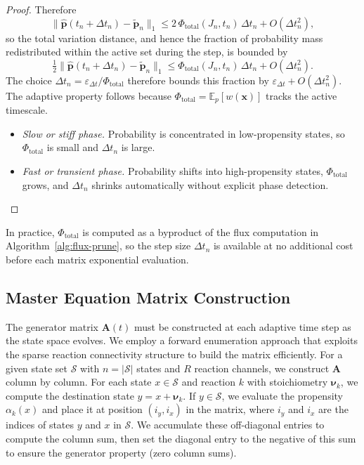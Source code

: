 \documentclass[onefignum,onetabnum]{siamart171218}
\begin{document}
\begin{proof}
Therefore
\[
\|\widehat{\boldsymbol{p}}(t_n+\Delta t_n) - \widetilde{\boldsymbol{p}}_n\|_1
\leq 2\,\Phi_{\mathrm{total}}(J_n,t_n)\,\Delta t_n + O(\Delta t_n^2),
\]
so the total variation distance, and hence the fraction of probability mass redistributed within the active set during the step, is bounded by
\[
\tfrac{1}{2}\|\widehat{\boldsymbol{p}}(t_n+\Delta t_n) - \widetilde{\boldsymbol{p}}_n\|_1
\leq \Phi_{\mathrm{total}}(J_n,t_n)\,\Delta t_n + O(\Delta t_n^2).
\]
The choice $\Delta t_n = \varepsilon_{\Delta t}/\Phi_{\mathrm{total}}$ therefore bounds this fraction by $\varepsilon_{\Delta t} + O(\Delta t_n^2)$. The adaptive property follows because $\Phi_{\mathrm{total}} = \mathbb{E}_p[w(\boldsymbol{x})]$ tracks the active timescale.
\begin{itemize}
\item \emph{Slow or stiff phase.} Probability is concentrated in low-propensity states, so $\Phi_{\mathrm{total}}$ is small and $\Delta t_n$ is large.
\item \emph{Fast or transient phase.} Probability shifts into high-propensity states, $\Phi_{\mathrm{total}}$ grows, and $\Delta t_n$ shrinks automatically without explicit phase detection.
\end{itemize}
\end{proof}

In practice, $\Phi_{\mathrm{total}}$ is computed as a byproduct of the flux computation in Algorithm~\ref{alg:flux-prune}, so the step size $\Delta t_n$ is available at no additional cost before each matrix exponential evaluation.

\subsection{Master Equation Matrix Construction}
\label{sec:matrix_construction}

The generator matrix $\mathbf{A}(t)$ must be constructed at each adaptive time step as the state space evolves. We employ a forward enumeration approach that exploits the sparse reaction connectivity structure to build the matrix efficiently. For a given state set $\mathcal{S}$ with $n = |\mathcal{S}|$ states and $R$ reaction channels, we construct $\mathbf{A}$ column by column. For each state $x \in \mathcal{S}$ and reaction $k$ with stoichiometry $\boldsymbol{\nu}_k$, we compute the destination state $y = x + \boldsymbol{\nu}_k$. If $y \in \mathcal{S}$, we evaluate the propensity $\alpha_k(x)$ and place it at position $(i_y, i_x)$ in the matrix, where $i_y$ and $i_x$ are the indices of states $y$ and $x$ in $\mathcal{S}$. We accumulate these off-diagonal entries to compute the column sum, then set the diagonal entry to the negative of this sum to ensure the generator property (zero column sums).
\end{document}
